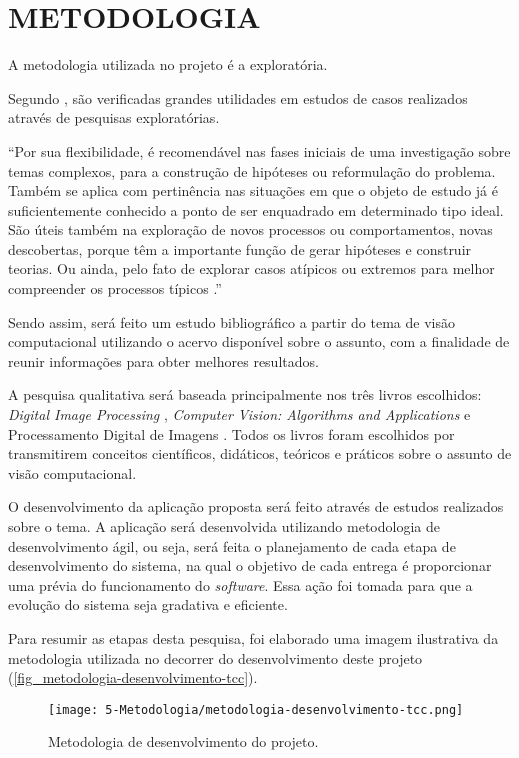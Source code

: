 \chapter{\textbf{METODOLOGIA}}
\label{metodologia}

A metodologia utilizada no projeto é a exploratória.

Segundo , são verificadas grandes utilidades em estudos de casos realizados através de pesquisas exploratórias.

\begin{citacao}
“Por sua flexibilidade, é recomendável nas fases iniciais de uma investigação sobre temas complexos, para a construção de hipóteses ou reformulação do problema. Também se aplica com pertinência nas situações em que o objeto de estudo já é suficientemente conhecido a ponto de ser enquadrado em determinado tipo ideal. São úteis também na exploração de novos processos ou comportamentos, novas descobertas, porque têm a importante função de gerar hipóteses e construir teorias. Ou ainda, pelo fato de explorar casos atípicos ou extremos para melhor compreender os processos típicos \cite{VENTURA2007}.”
\end{citacao}

Sendo assim, será feito um estudo bibliográfico a partir do tema de visão computacional utilizando o acervo disponível sobre o assunto, com a finalidade de reunir informações para obter melhores resultados.

A pesquisa qualitativa será baseada principalmente nos três livros escolhidos: \textit{Digital Image Processing} \cite{GONZALEZ2002},  \textit{Computer Vision: Algorithms and Applications} \cite{SZELISKI2010} e Processamento Digital de Imagens \cite{FILHO1999}. Todos os livros foram escolhidos por transmitirem conceitos científicos, didáticos, teóricos e práticos sobre o assunto de visão computacional.

O desenvolvimento da aplicação proposta será feito através de estudos realizados sobre o tema. A aplicação será desenvolvida utilizando metodologia de desenvolvimento ágil, ou seja, será feita o planejamento de cada etapa de desenvolvimento do sistema, na qual o objetivo de cada entrega é proporcionar uma prévia do funcionamento do \textit{software}. Essa ação foi tomada para que a evolução do sistema seja gradativa e eficiente.

Para resumir as etapas desta pesquisa, foi elaborado uma imagem ilustrativa da metodologia utilizada no decorrer do desenvolvimento deste projeto (\autoref{fig_metodologia-desenvolvimento-tcc}).

\begin{figure}[h]
	\caption{\label{fig_metodologia-desenvolvimento-tcc}Metodologia de desenvolvimento do projeto.}
	\begin{center}
		\texttt{[image: 5-Metodologia/metodologia-desenvolvimento-tcc.png]}
	\end{center}
	\centering {}
\end{figure}